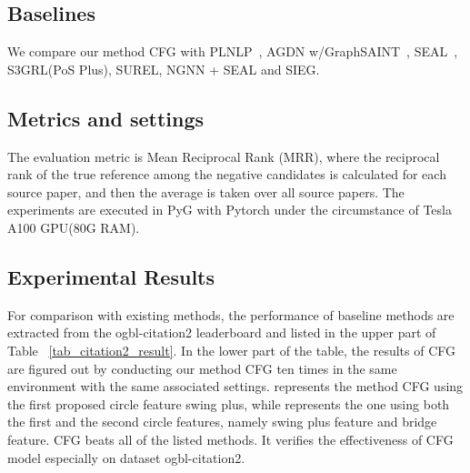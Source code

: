 \documentclass[sigconf]{acmart}
\begin{document}
\subsection{Baselines} We compare our method CFG with PLNLP~\cite{wang2021pairwise}, AGDN w/GraphSAINT~\cite{sun2020adaptive}, SEAL~\cite{zhang2018link}, S3GRL(PoS Plus)\citep{louis2023simplifying}, SUREL\citep{yin2022algorithm}, NGNN + SEAL \citep{DBLP:journals/corr/abs-2111-11638} and SIEG\citep{sieg2023}. 

\subsection{Metrics and settings} The evaluation metric is Mean Reciprocal Rank (MRR), where the reciprocal rank of the true reference among the negative candidates is calculated for each source paper, and then the average is taken over all source papers. The experiments are executed in PyG with Pytorch under the circumstance of Tesla A100 GPU(80G RAM).


\subsection{Experimental Results}
For comparison with existing methods, the performance of baseline methods are extracted from the ogbl-citation2 leaderboard and listed in the upper part of Table ~\ref{tab_citation2_result}. In the lower part of the table, the results of CFG are figured out by conducting our method CFG ten times in the same environment with the same associated settings.  represents the method CFG using the first proposed circle feature swing plus, while  represents the one using both the first and the second circle features, namely swing plus feature and bridge feature.
CFG beats all of the listed methods. It verifies the effectiveness of CFG model especially on dataset ogbl-citation2.
\end{document}
